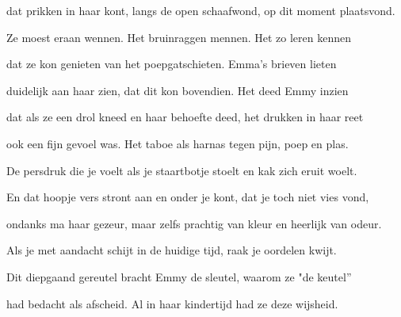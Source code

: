 dat prikken in haar kont,
langs de open schaafwond,
op dit moment plaatsvond.

Ze moest eraan wennen.
Het bruinraggen mennen.
Het zo leren kennen

dat ze kon genieten
van het poepgatschieten. Emma’s brieven lieten

duidelijk aan haar zien,
dat dit kon bovendien.
Het deed Emmy inzien

dat als ze een drol kneed
en haar behoefte deed,
het drukken in haar reet

ook een fijn gevoel was.
Het taboe als harnas
tegen pijn, poep en plas.

De persdruk die je voelt
als je staartbotje stoelt
en kak zich eruit woelt.

En dat hoopje vers stront
aan en onder je kont,
dat je toch niet vies vond,

ondanks ma haar gezeur,
maar zelfs prachtig van kleur
en heerlijk van odeur.

Als je met aandacht schijt
in de huidige tijd,
raak je oordelen kwijt.

Dit diepgaand gereutel
bracht Emmy de sleutel,
waarom ze "de keutel”

had bedacht als afscheid.
Al in haar kindertijd
had ze deze wijsheid.
